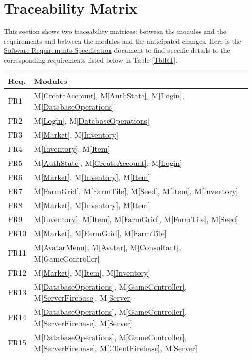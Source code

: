 \documentclass[12pt, titlepage]{article}
\newcommand{\mref}[1]{M\ref{#1}}
\begin{document}
\section{Traceability Matrix} \label{SecTM}

This section shows two traceability matrices: between the modules and the
requirements and between the modules and the anticipated changes. Here is the \href{https://github.com/brandonduong/Farming-Matters/blob/main/docs/SRS/SRS.pdf}{Software Requirements Specification} document to find specific details to the corresponding requirements listed below in Table \ref{TblRT}.

\begin{table}[H]
\centering
\begin{tabular}{p{} p{}}
\toprule
\textbf{Req.} & \textbf{Modules}\\
\midrule
FR1 & \mref{CreateAccount}, \mref{AuthState}, \mref{Login}, \mref{DatabaseOperations}\\
FR2 &  \mref{Login}, \mref{DatabaseOperations}\\
FR3 & \mref{Market}, \mref{Inventory} \\
FR4 & \mref{Inventory}, \mref{Item}\\
FR5 & \mref{AuthState}, \mref{CreateAccount}, \mref{Login}\\
FR6 & \mref{Market}, \mref{Inventory}, \mref{Item}\\
FR7 & \mref{FarmGrid}, \mref{FarmTile}, \mref{Seed}, \mref{Item}, \mref{Inventory}\\
FR8 & \mref{Market}, \mref{Inventory}, \mref{Item}\\
FR9 & \mref{Inventory}, \mref{Item}, \mref{FarmGrid}, \mref{FarmTile}, \mref{Seed}\\
FR10 & \mref{Market}, \mref{FarmGrid}, \mref{FarmTile}\\
FR11 & \mref{AvatarMenu}, \mref{Avatar}, \mref{Consultant}, \mref{GameController}\\
FR12 & \mref{Market}, \mref{Item}, \mref{Inventory}\\
FR13 & \mref{DatabaseOperations}, \mref{GameController}, \mref{ServerFirebase}, \mref{Server}\\
FR14 & \mref{DatabaseOperations}, \mref{GameController}, \mref{ServerFirebase}, \mref{Server}\\
FR15 & \mref{DatabaseOperations}, \mref{GameController}, \mref{ServerFirebase}, \mref{ClientFirebase}, \mref{Server}\\

\end{tabular}
\end{table}
\end{document}

